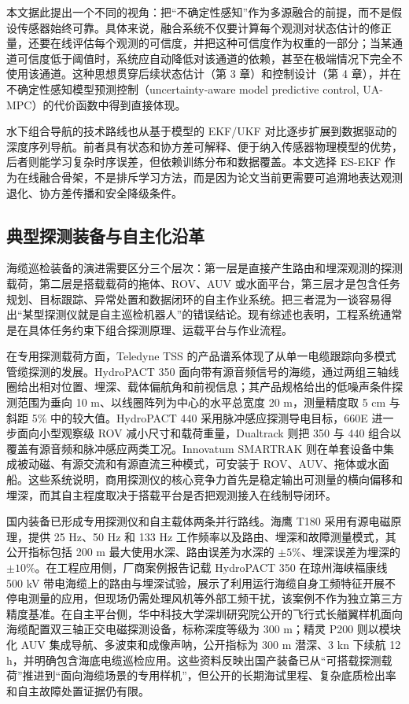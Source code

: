 本文据此提出一个不同的视角：把``不确定性感知''作为多源融合的前提，而不是假设传感器始终可靠。具体来说，融合系统不仅要计算每个观测对状态估计的修正量，还要在线评估每个观测的可信度，并把这种可信度作为权重的一部分；当某通道可信度低于阈值时，系统应自动降低对该通道的依赖，甚至在极端情况下完全不使用该通道。这种思想贯穿后续状态估计（第 3 章）和控制设计（第 4 章），并在不确定性感知模型预测控制（uncertainty-aware model predictive control, UA-MPC）的代价函数中得到直接体现。

水下组合导航的技术路线也从基于模型的 EKF/UKF 对比\cite{allotta2015comparison}逐步扩展到数据驱动的深度序列导航\cite{zhang2020navnet}。前者具有状态和协方差可解释、便于纳入传感器物理模型的优势，后者则能学习复杂时序误差，但依赖训练分布和数据覆盖。本文选择 ES-EKF 作为在线融合骨架，不是排斥学习方法，而是因为论文当前更需要可追溯地表达观测退化、协方差传播和安全降级条件。

\subsection{典型探测装备与自主化沿革}\label{sec:ch01-1-2-4}

海缆巡检装备的演进需要区分三个层次：第一层是直接产生路由和埋深观测的探测载荷，第二层是搭载载荷的拖体、ROV、AUV 或水面平台，第三层才是包含任务规划、目标跟踪、异常处置和数据闭环的自主作业系统。把三者混为一谈容易得出``某型探测仪就是自主巡检机器人''的错误结论。现有综述也表明，工程系统通常是在具体任务约束下组合探测原理、运载平台与作业流程\cite{zhang2025submarine,cen2017submarine}。

在专用探测载荷方面，Teledyne TSS 的产品谱系体现了从单一电缆跟踪向多模式管缆探测的发展。HydroPACT 350 面向带有源音频信号的海缆，通过两组三轴线圈给出相对位置、埋深、载体偏航角和前视信息；其产品规格给出的低噪声条件探测范围为垂向 10 m、以线圈阵列为中心的水平总宽度 20 m，测量精度取 5 cm 与斜距 5\% 中的较大值\cite{teledyne2021hydropact350}。HydroPACT 440 采用脉冲感应探测导电目标，660E 进一步面向小型观察级 ROV 减小尺寸和载荷重量，Dualtrack 则把 350 与 440 组合以覆盖有源音频和脉冲感应两类工况\cite{teledyne2026hydropactline}。Innovatum SMARTRAK 则在单套设备中集成被动磁、有源交流和有源直流三种模式，可安装于 ROV、AUV、拖体或水面船\cite{innovatum_smartrak}。这些系统说明，商用探测仪的核心竞争力首先是稳定输出可测量的横向偏移和埋深，而其自主程度取决于搭载平台是否把观测接入在线制导闭环。

国内装备已形成专用探测仪和自主载体两条并行路线。海鹰 T180 采用有源电磁原理，提供 25 Hz、50 Hz 和 133 Hz 工作频率以及路由、埋深和故障测量模式，其公开指标包括 200 m 最大使用水深、路由误差为水深的 \(\pm 5\%\)、埋深误差为埋深的 \(\pm 10\%\)\cite{haiying_t180}。在工程应用侧，厂商案例报告记载 HydroPACT 350 在琼州海峡福康线 500 kV 带电海缆上的路由与埋深试验，展示了利用运行海缆自身工频特征开展不停电测量的应用，但现场仍需处理风机等外部工频干扰，该案例不作为独立第三方精度基准\cite{teledyne2017hainan350}。在自主平台侧，华中科技大学深圳研究院公开的飞行式长艏翼样机面向海缆配置双三轴正交电磁探测设备，标称深度等级为 300 m\cite{hust2023cableauv}；精灵 P200 则以模块化 AUV 集成导航、多波束和成像声呐，公开指标为 300 m 潜深、3 kn 下续航 12 h，并明确包含海底电缆巡检应用\cite{fsea_p200}。这些资料反映出国产装备已从``可搭载探测载荷''推进到``面向海缆场景的专用样机''，但公开的长期海试里程、复杂底质检出率和自主故障处置证据仍有限。

